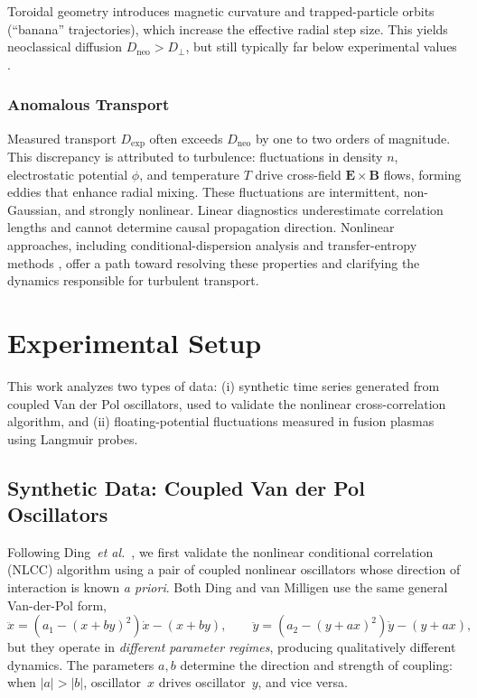 \documentclass[12pt]{article}
\begin{document}
Toroidal geometry introduces magnetic curvature and trapped-particle orbits (“banana” trajectories),
which increase the effective radial step size. This yields neoclassical diffusion
$D_{\mathrm{neo}} > D_{\perp}$, but still typically far below experimental values
\cite{carrerasProgressAnomalousTransport1997}.

\subsubsection*{Anomalous Transport}

Measured transport $D_{\mathrm{exp}}$ often exceeds $D_{\mathrm{neo}}$ by one to two orders of magnitude.
This discrepancy is attributed to turbulence: fluctuations in density $n$, electrostatic potential
$\phi$, and temperature $T$ drive cross-field $\mathbf{E}\times\mathbf{B}$ flows, forming eddies that
enhance radial mixing. These fluctuations are intermittent, non-Gaussian, and strongly nonlinear.
Linear diagnostics underestimate correlation lengths and cannot determine causal propagation
direction. Nonlinear approaches, including conditional-dispersion analysis
\cite{dingNonlinearRadialCorrelation1997} and transfer-entropy methods
\cite{vanmilligenCausalityDetectionTurbulence2013,vanmilligenRadialPropagationHeat2019},
offer a path toward resolving these properties and clarifying the dynamics responsible for
turbulent transport.

\section{Experimental Setup}

This work analyzes two types of data: (i) synthetic time series generated from coupled
Van der Pol oscillators, used to validate the nonlinear cross-correlation algorithm, and
(ii) floating-potential fluctuations measured in fusion plasmas using Langmuir probes.

\subsection{Synthetic Data: Coupled Van der Pol Oscillators}

Following Ding~\textit{et al.}~\cite{dingNonlinearRadialCorrelation1997}, we first validate the nonlinear conditional correlation (NLCC) algorithm using a pair of coupled nonlinear oscillators whose direction of interaction is known \emph{a priori}. Both Ding and van Milligen use the same general Van-der-Pol form,
\[
    \ddot{x} = \left(a_1 - (x + b y)^2\right)\dot{x} - (x + b y), \qquad
    \ddot{y} = \left(a_2 - (y + a x)^2\right)\dot{y} - (y + a x),
\]
but they operate in \emph{different parameter regimes}, producing qualitatively different dynamics.
The parameters $a,b$ determine the direction and strength of coupling: when $|a| > |b|$, oscillator~$x$ drives 
oscillator~$y$, and vice versa.
\end{document}
